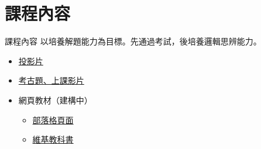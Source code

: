 \section{課程內容}
\begin{frame}{課程內容}
    以培養解題能力為目標。先通過考試，後培養邏輯思辨能力。

    \begin{itemize}
        \item \href{https://jdh8.github.io/calculus-slides/}{投影片}
        \item \href{http://jdh8.org/category/calculus-course/}{考古題、上課影片}
        \item 網頁教材（建構中）
            \begin{itemize}
                \item \href{http://jdh8.org/calculus/}{部落格頁面}
                \item \href{https://zh.wikibooks.org/wiki/\%E5\%BE\%AE\%E7\%A7\%AF\%E5\%88\%86\%E5\%AD\%A6}{維基教科書}
            \end{itemize}
    \end{itemize}
\end{frame}

